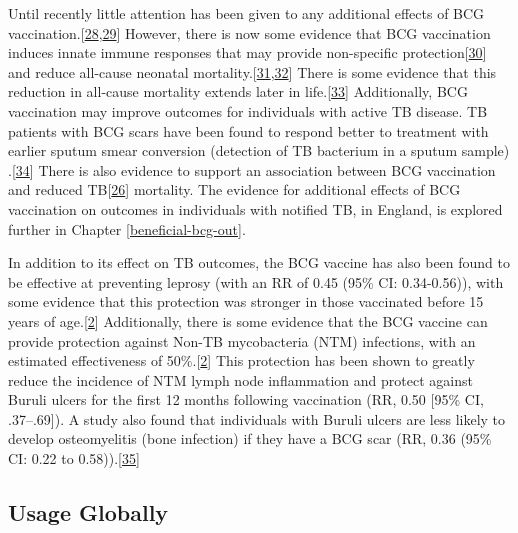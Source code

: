 \documentclass[11pt,twoside]{bristolthesis}
\begin{document}
  Until recently little attention has been given to any additional effects of BCG vaccination.{[}\protect\hyperlink{ref-Fine2005a}{28},\protect\hyperlink{ref-Teo2006}{29}{]} However, there is now some evidence that BCG vaccination induces innate immune responses that may provide non-specific protection{[}\protect\hyperlink{ref-Kleinnijenhuis2012}{30}{]} and reduce all-cause neonatal mortality.{[}\protect\hyperlink{ref-Garly2003}{31},\protect\hyperlink{ref-Higgins}{32}{]} There is some evidence that this reduction in all-cause mortality extends later in life.{[}\protect\hyperlink{ref-Rieckmann2016}{33}{]} Additionally, BCG vaccination may improve outcomes for individuals with active TB disease. TB patients with BCG scars have been found to respond better to treatment with earlier sputum smear conversion (detection of TB bacterium in a sputum sample) .{[}\protect\hyperlink{ref-Jeremiah2010}{34}{]} There is also evidence to support an association between BCG vaccination and reduced TB{[}\protect\hyperlink{ref-Abubakar2013}{26}{]} mortality. The evidence for additional effects of BCG vaccination on outcomes in individuals with notified TB, in England, is explored further in Chapter \ref{beneficial-bcg-out}.
  
  In addition to its effect on TB outcomes, the BCG vaccine has also been found to be effective at preventing leprosy (with an RR of 0.45 (95\% CI: 0.34-0.56)), with some evidence that this protection was stronger in those vaccinated before 15 years of age.{[}\protect\hyperlink{ref-TheWorldHealthOrganization:2018va}{2}{]} Additionally, there is some evidence that the BCG vaccine can provide protection against Non-TB mycobacteria (NTM) infections, with an estimated effectiveness of 50\%.{[}\protect\hyperlink{ref-TheWorldHealthOrganization:2018va}{2}{]} This protection has been shown to greatly reduce the incidence of NTM lymph node inflammation and protect against Buruli ulcers for the first 12 months following vaccination (RR, 0.50 {[}95\% CI, .37--.69{]}). A study also found that individuals with Buruli ulcers are less likely to develop osteomyelitis (bone infection) if they have a BCG scar (RR, 0.36 (95\% CI: 0.22 to 0.58)).{[}\protect\hyperlink{ref-Zimmermann:2018io}{35}{]}
  
  \hypertarget{usage-globally}{%
  \subsection{Usage Globally}\label{usage-globally}}
  
\end{document}

